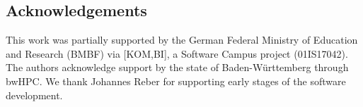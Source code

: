 \subsection*{Acknowledgements}
This work was partially supported by the German Federal Ministry of Education and Research (BMBF) via [KOM,BI], a Software Campus project (01IS17042).
The authors acknowledge support by the state of Baden-W{\"u}rttemberg through bwHPC.
We thank Johannes Reber for supporting early stages of the software development.
